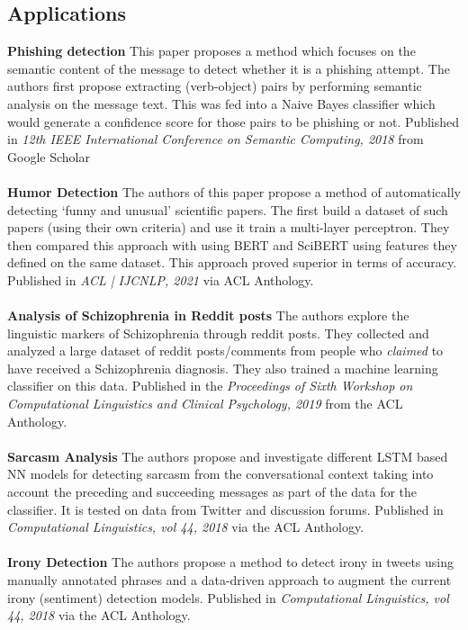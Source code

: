 \documentclass[a4]{article}
\begin{document}
\subsection*{Applications}
\textbf{Phishing detection} \cite{phishing} This paper proposes a method which focuses on the semantic content of the message to detect whether it is a phishing attempt. The authors first propose extracting (verb-object) pairs by performing semantic analysis on the message text. This was fed into a Naive Bayes classifier which would generate a confidence score for those pairs to be phishing or not. Published in \textit{12th IEEE International Conference on Semantic Computing, 2018} from Google Scholar
\\
\\
\textbf{Humor Detection} \cite{humordetection} The authors of this paper propose a method of automatically detecting `funny and unusual' scientific papers. The first build a dataset of such papers (using their own criteria) and use it train a multi-layer perceptron. They then compared this approach with using BERT and SciBERT using features they defined on the same dataset. This approach proved superior in terms of accuracy. Published in \textit{ACL | IJCNLP, 2021} via ACL Anthology.
\\
\\
\textbf{Analysis of Schizophrenia in Reddit posts} \cite{schizoReddit} The authors explore the linguistic markers of Schizophrenia through reddit posts. They collected and analyzed a large dataset of reddit posts/comments from people who \textit{claimed} to have received a Schizophrenia diagnosis. They also trained a machine learning classifier on this data. Published in the \textit{Proceedings of Sixth Workshop on Computational Linguistics and Clinical Psychology, 2019} from the ACL Anthology.
\\
\\
\textbf{Sarcasm Analysis} \cite{sarcasm} The authors propose and investigate different LSTM based NN models for detecting sarcasm from the conversational context taking into account the preceding and succeeding messages as part of the data for the classifier. It is tested on data from Twitter and discussion forums. Published in \textit{Computational Linguistics, vol 44, 2018} via the ACL Anthology. 
\\
\\
\textbf{Irony Detection} \cite{irony} The authors propose a method to detect irony in tweets using manually annotated phrases and a data-driven approach to augment the current irony (sentiment) detection models. Published in \textit{Computational Linguistics, vol 44, 2018} via the ACL Anthology. 
\end{document}
